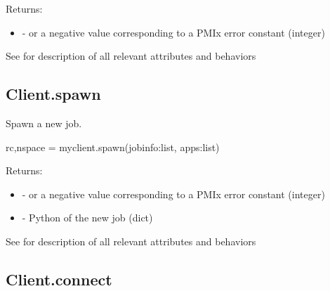 \begin{arglist}
\end{arglist}

Returns:

\begin{itemize}
    \item {} -  or a negative value corresponding to a PMIx error constant (integer)
\end{itemize}


See  for description of all relevant attributes and behaviors


\subsection{Client.spawn}

\summary

Spawn a new job.

\format

\pyspecificstart
\begin{codepar}
rc,nspace = myclient.spawn(jobinfo:list, apps:list)
\end{codepar}
\pyspecificend

\begin{arglist}
\end{arglist}

Returns:

\begin{itemize}
    \item {} -  or a negative value corresponding to a PMIx error constant (integer)
    \item {} - Python  of the new job (dict)
\end{itemize}


See  for description of all relevant attributes and behaviors


\subsection{Client.connect}

